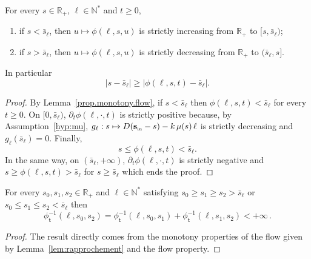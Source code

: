 \documentclass[AHL,Unicode,longabstracts,published]{cedram}
\newcommand{\RR}{\mathbb{R}}
\newcommand{\NN}{\mathbb{N}}
\newcommand{\Sin}{{\mathbf s}_{\textrm{\tiny\rm in}}}
\newcommand{\phit}{\phi_\textsf{t}^{-1}}
\newcommand{\1}{\mathbf{1}}
\begin{document}
\begin{lemm}\label{lem:rapprochement}
For every $s \in \RR_+$, $\ell \in \NN^*$ and $t\geq 0$,
\begin{enumerate}
\item\label{lemmA.3.1} if $s< \bar s_\ell$, then $u\mapsto \phi(\ell,s,u)$ is strictly increasing from $\RR_+$ to $[s,\bar s_\ell)$;
\item\label{lemmA.3.2} if $s> \bar s_\ell$, then $u\mapsto \phi(\ell,s,u)$ is strictly decreasing from $\RR_+$ to $(\bar s_\ell,s]$.
\end{enumerate}
In particular
\[
|s - \bar s_\ell| \geq \left|\phi(\ell,s,t) - \bar s_\ell \right|.
\]
\end{lemm}
\begin{proof}
By Lemma~\ref{prop.monotony.flow}, if $s< \bar s_\ell$ then $\phi(\ell,s,t) < \bar s_\ell$ for every $t\geq 0$. On $[0, \bar s_\ell)$, $\partial_t \phi(\ell,\cdot,t)$ is strictly positive because, by Assumption~\ref{hyp:mu}, $g_\ell:s\mapsto D(\Sin-s)-k\,\mu(s)\,\ell$ is strictly decreasing and $g_\ell(\bar s_\ell)=0$. Finally,
\[
s \leq \phi(\ell,s,t) < \bar s_\ell.
\]
In the same way, on $(\bar s_\ell,+\infty)$, $\partial_t \phi(\ell,\cdot,t)$ is strictly negative and $s \geq \phi(\ell,s,t) > \bar s_\ell$ for $s\geq \bar s_\ell$ which ends the proof.
\end{proof}


\begin{coro}\label{cor:monotonyphit}
For every $s_0,s_1,s_2 \in \RR_+$ and $\ell \in \NN^*$ satisfying $s_0 \geq s_1 \geq s_2 > \bar s_\ell$ or $s_0 \leq s_1 \leq s_2 < \bar s_\ell$ then
\[
\phit(\ell,s_0,s_2) = \phit(\ell,s_0,s_1)+\phit(\ell,s_1,s_2)<+\infty \,.
\]
\end{coro}
\begin{proof}
The result directly comes from the monotony properties of the flow given by Lemma~\ref{lem:rapprochement} and the flow property.
\end{proof}
\end{document}
